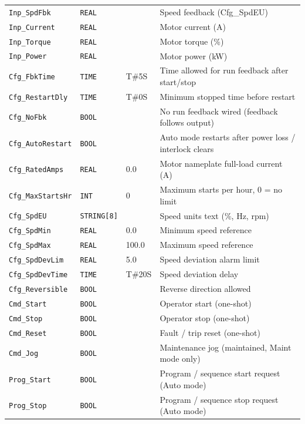 \begin{small}
\begin{longtable}{@{}P{3.70cm}P{2.20cm}P{1.70cm}P{8.91cm}@{}}
\texttt{Inp\_SpdFbk} & \texttt{REAL} &  & Speed feedback (Cfg\_SpdEU) \\
\texttt{Inp\_Current} & \texttt{REAL} &  & Motor current (A) \\
\texttt{Inp\_Torque} & \texttt{REAL} &  & Motor torque (\%) \\
\texttt{Inp\_Power} & \texttt{REAL} &  & Motor power (kW) \\
\texttt{Cfg\_FbkTime} & \texttt{TIME} & T\#5S & Time allowed for run feedback after start/\allowbreak{}stop \\
\texttt{Cfg\_RestartDly} & \texttt{TIME} & T\#0S & Minimum stopped time before restart \\
\texttt{Cfg\_NoFbk} & \texttt{BOOL} &  & No run feedback wired (feedback follows output) \\
\texttt{Cfg\_AutoRestart} & \texttt{BOOL} &  & Auto mode restarts after power loss /\allowbreak{} interlock clears \\
\texttt{Cfg\_RatedAmps} & \texttt{REAL} & 0.0 & Motor nameplate full-load current (A) \\
\texttt{Cfg\_MaxStartsHr} & \texttt{INT} & 0 & Maximum starts per hour, 0 = no limit \\
\texttt{Cfg\_SpdEU} & \texttt{STRING[8]} &  & Speed units text (\%, Hz, rpm) \\
\texttt{Cfg\_SpdMin} & \texttt{REAL} & 0.0 & Minimum speed reference \\
\texttt{Cfg\_SpdMax} & \texttt{REAL} & 100.0 & Maximum speed reference \\
\texttt{Cfg\_SpdDevLim} & \texttt{REAL} & 5.0 & Speed deviation alarm limit \\
\texttt{Cfg\_SpdDevTime} & \texttt{TIME} & T\#20S & Speed deviation delay \\
\texttt{Cfg\_Reversible} & \texttt{BOOL} &  & Reverse direction allowed \\
\texttt{Cmd\_Start} & \texttt{BOOL} &  & Operator start (one-shot) \\
\texttt{Cmd\_Stop} & \texttt{BOOL} &  & Operator stop (one-shot) \\
\texttt{Cmd\_Reset} & \texttt{BOOL} &  & Fault /\allowbreak{} trip reset (one-shot) \\
\texttt{Cmd\_Jog} & \texttt{BOOL} &  & Maintenance jog (maintained, Maint mode only) \\
\texttt{Prog\_Start} & \texttt{BOOL} &  & Program /\allowbreak{} sequence start request (Auto mode) \\
\texttt{Prog\_Stop} & \texttt{BOOL} &  & Program /\allowbreak{} sequence stop request (Auto mode) \\

\end{longtable}
\end{small}
